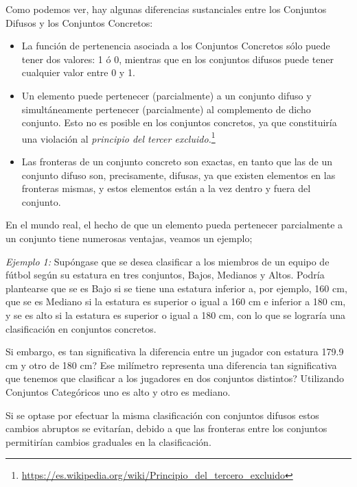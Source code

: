 Como podemos ver, hay algunas diferencias sustanciales entre los Conjuntos Difusos y los Conjuntos Concretos:
\begin{itemize}
	\item La función de pertenencia asociada a los Conjuntos Concretos sólo puede
	tener dos valores: 1 ó 0, mientras que en los conjuntos difusos puede
	tener cualquier valor entre 0 y 1.
	\item Un elemento puede pertenecer (parcialmente) a un conjunto difuso y
	simultáneamente pertenecer (parcialmente) al complemento de dicho
	conjunto. Esto no es posible en los conjuntos concretos, ya que
	constituiría una violación al \textit{principio del tercer excluido.}\footnote{\url{https://es.wikipedia.org/wiki/Principio_del_tercero_excluido}}
	\item Las fronteras de un conjunto concreto son exactas, en tanto que las de
	un conjunto difuso son, precisamente, difusas, ya que existen elementos
	en las fronteras mismas, y estos elementos están a la vez dentro y fuera
	del conjunto.
\end{itemize}

En el mundo real, el hecho de que un elemento pueda pertenecer parcialmente a un conjunto tiene numerosas ventajas, veamos un ejemplo;

\textit{Ejemplo 1:} Supóngase que se desea clasificar a los miembros de un equipo
de fútbol según su estatura en tres conjuntos, Bajos, Medianos y Altos.
Podría plantearse que se es Bajo si se tiene una estatura inferior a, por
ejemplo, 160 cm, que se es Mediano si la estatura es superior o igual a 160
cm e inferior a 180 cm, y se es alto si la estatura es superior o igual a 180
cm, con lo que se lograría una clasificación en conjuntos concretos. \label{ej:1}

Si embargo, es tan significativa la diferencia entre un jugador con estatura 179.9 cm y otro de 180 cm? Ese milímetro representa una diferencia tan significativa que tenemos que clasificar a los jugadores en dos conjuntos distintos? Utilizando Conjuntos Categóricos uno es alto y otro es mediano.

Si se optase por efectuar la misma
clasificación con conjuntos difusos estos cambios abruptos se evitarían,
debido a que las fronteras entre los conjuntos permitirían cambios graduales
en la clasificación.

